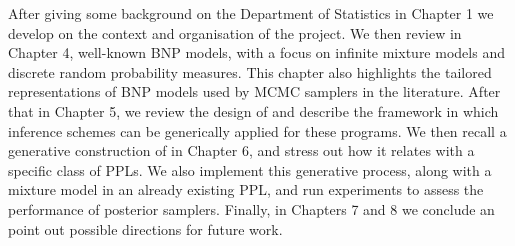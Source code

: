 \documentclass[twoside,10pt,openany,a4paper]{rapport}
\begin{document}
After giving some background on the Department of Statistics in Chapter 1 we develop on the context and organisation of the project. We then review in Chapter 4, well-known \acrlong{BNP} models, with a focus on infinite mixture models and discrete random probability measures. This chapter also highlights the tailored representations of \gls{BNP} models used by \acrlong{MCMC} samplers in the literature. After that in Chapter 5, we review the design of  and describe the framework in which inference schemes can be generically applied for these programs.
We then recall a generative construction of  in Chapter 6, and stress out how it relates with a specific class of \glspl{PPL}. We also implement this generative process, along with a mixture model in an already existing \gls{PPL}, and run experiments to assess the performance of posterior samplers.
Finally, in Chapters 7 and 8 we conclude an point out possible directions for future work.











% 














\end{document}
